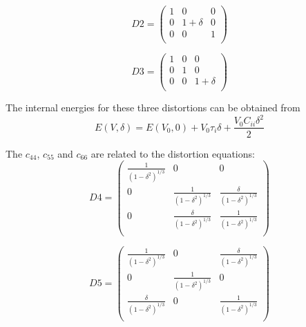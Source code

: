 \begin{equation}
\label{eq_D2}
	D2 = \left ( \begin{array}{ccc}
						1 & 0 & 0 \\
						0 & 1+\delta & 0 \\
						0 & 0 & 1 \\
					\end{array}\right )
\end{equation}

\begin{equation}
\label{eq_D3}
D3 = \left ( \begin{array}{ccc}
						1 & 0 & 0 \\
						0 & 1 & 0 \\
						0 & 0 & 1+\delta \\
						\end{array}\right ) 
\end{equation}

The internal energies for these three distortions can be obtained from 
\begin{equation}
\label{eq_d1d2d3}
E(V,\delta) = E(V_0,0) + V_0\tau_i \delta + \frac{V_0C_{ii}\delta^2}{2}
\end{equation}

The $c_{44}$, $c_{55}$ and $c_{66}$ are related to the distortion equations:
\begin{equation}
\label{eq_d4}
	D4 = \left ( \begin{array}{ccc}
						\frac{1}{(1-\delta^2)^{1/3}} & 0 & 0 \\
						0 & \frac{1}{(1-\delta^2)^{1/3}} & \frac{\delta}{(1-\delta^2)^{1/3}} \\
						0 & \frac{\delta}{(1-\delta^2)^{1/3}} & \frac{1}{(1-\delta^2)^{1/3}} \\
						\end{array}\right )
\end{equation} 

\begin{equation}
\label{eq_d5}
	D5 = \left ( \begin{array}{ccc}
						\frac{1}{(1-\delta^2)^{1/3}} & 0 & \frac{\delta}{(1-\delta^2)^{1/3}} \\
						0 & \frac{1}{(1-\delta^2)^{1/3}} & 0 \\
						\frac{\delta}{(1-\delta^2)^{1/3}} & 0 & \frac{1}{(1-\delta^2)^{1/3}} \\
						\end{array}\right )
\end{equation}

